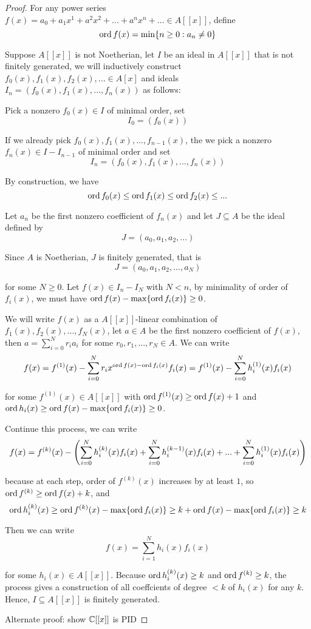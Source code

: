 \begin{proof}
	For any power series $f(x) = a_0 + a_1 x^1 + a^2 x^2 + ... + a^n x^n + ... \in A[[x]]$, define
	$$
		\ord f(x) = \min \set{n \geq 0: a_n \neq 0}
	$$
	
	Suppose $A[[x]]$ is not Noetherian, let $I$ be an ideal in $A[[x]]$ that is not finitely generated, we will inductively construct $f_0(x), f_1(x), f_2(x), ... \in A[x]$ and ideals $I_n = (f_0(x), f_1(x), ..., f_n(x))$ as follows:
	
	Pick a nonzero  $f_0(x) \in I$ of minimal order, set
	$$
		I_0 = (f_0(x))
	$$
	
	If we already pick $f_0(x), f_1(x), ..., f_{n-1}(x)$, the we pick a nonzero $f_n(x) \in I - I_{n-1}$ of minimal order and set
	$$
		I_n = (f_0(x), f_1(x), ..., f_n(x))
	$$
	
	By construction, we have
	$$
		\ord f_0(x) \leq \ord f_1(x) \leq \ord f_2(x) \leq ...
	$$
	
	Let $a_n$ be the first nonzero coefficient of $f_n(x)$ and let $J \subseteq A$ be the ideal defined by
	$$
		J = (a_0, a_1, a_2, ...)
	$$
	
	Since $A$ is Noetherian, $J$ is finitely generated, that is
	$$
		J = (a_0, a_1, a_2, ..., a_N)
	$$
	
	for some $N \geq 0$. Let $f(x) \in I_n - I_N$ with $N < n$, by minimality of order of $f_i(x)$, we must have $\ord f(x) - \max\set{\ord f_i(x)} \geq 0$.
	
	We will write $f(x)$ as a $A[[x]]$-linear combination of $f_1(x), f_2(x), ..., f_N(x)$, let $a \in A$ be the first nonzero coefficient of $f(x)$, then $a = \sum_{i=0}^N r_i a_i $	for some $r_0, r_1, ..., r_N \in A$. We can write
	$$
		f(x) = f^{(1)}(x) - \sum_{i=0}^N r_i x^{\ord f(x) - \ord f_i(x)} f_i(x) = f^{(1)}(x) - \sum_{i=0}^N h^{(1)}_i(x) f_i(x)
	$$
	
	for some $f^{(1)}(x) \in A[[x]]$ with $\ord f^{(1)}(x) \geq \ord f(x) + 1$ and $\ord h_i(x) \geq \ord f(x) - \max\set{\ord f_i(x)} \geq 0$.
	
	 Continue this process, we can write
	$$
		f(x) = f^{(k)}(x) - \tuple*{\sum_{i=0}^N h^{(k)}_i(x) f_i(x) + \sum_{i=0}^N h^{(k-1)}_i(x) f_i(x) + ... + \sum_{i=0}^N h^{(1)}_i(x) f_i(x)}
	$$
	
	because at each step, order of $f^{(k)}(x)$ increases by at least $1$, so $\ord f^{(k)} \geq \ord f(x) + k$, and
	$$
		\ord h^{(k)}_i(x) \geq \ord f^{(k)}(x) - \max\set{\ord f_i(x)} \geq k + \ord f(x) - \max\set{\ord f_i(x)} \geq k
	$$
	
	Then we can write
	$$
		f(x) = \sum_{i=1}^N h_i(x) f_i(x)
	$$
	
	for some $h_i(x) \in A[[x]]$. Because $\ord h^{(k)}_i(x) \geq k$ and $\ord f^{(k)} \geq k$, the process gives a construction of all coeffcients of degree $< k$ of $h_i(x)$ for any $k$. Hence, $I \subseteq A[[x]]$ is finitely generated.
	
	Alternate proof: show $\C[[x]]$ is PID
\end{proof}

